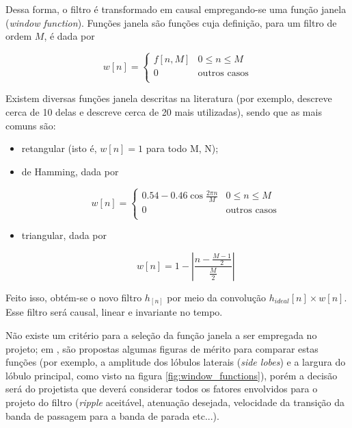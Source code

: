 Dessa forma, o filtro é transformado em causal empregando-se uma função janela (\textit{window function}). Funções janela são funções cuja definição, para um filtro de ordem $M$, é dada por

\[ w[n] = \begin{cases} 
      f[n, M] & 0 \leq n \leq M \\
      0 & \text{outros casos} \\
   \end{cases}
\]

Existem diversas funções janela descritas na literatura (por exemplo, \cite{diniz} descreve cerca de 10 delas e \cite{harris} descreve cerca de 20 mais utilizadas), sendo que as mais comuns são:

\begin{itemize}
\item retangular (isto é, $w[n] = 1$ para todo M, N);
\item de Hamming, dada por

\[ w[n] = \begin{cases} 
      0.54 - 0.46 \cos{\frac{2 \pi n}{M}} & 0 \leq n \leq M \\
      0 & \text{outros casos} \\
   \end{cases}
\]
\item triangular, dada por 

\begin{equation}
w[n] = 1 - \left|\frac{n-\frac{M-1}{2}}{\frac{M}{2}}\right|
\end{equation}

\end{itemize}

Feito isso, obtém-se o novo filtro $h_[n]$ por meio da convolução $h_{ideal}[n] \times w[n]$. Esse filtro será causal, linear e invariante no tempo.

Não existe um critério para a seleção da função janela a ser empregada no projeto; em \cite{harris}, são propostas algumas figuras de mérito para comparar estas funções (por exemplo, a amplitude dos lóbulos laterais (\textit{side lobes}) e a largura do lóbulo principal, como visto na figura \ref{fig:window_functions}), porém a decisão será do projetista que deverá considerar todos os fatores envolvidos para o projeto do filtro (\textit{ripple} aceitável, atenuação desejada, velocidade da transição da banda de passagem para a banda de parada etc...).

